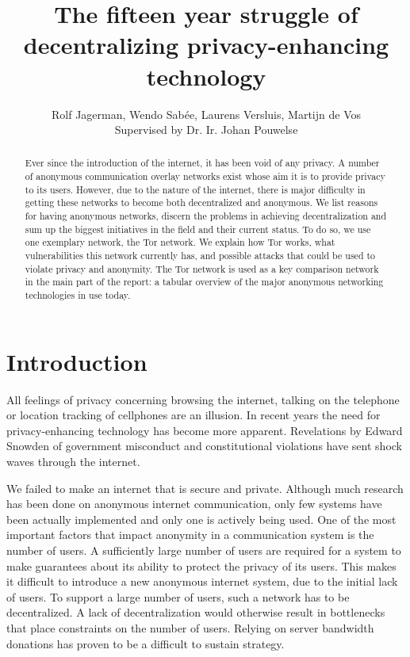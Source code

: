 \documentclass{article}
\begin{document}


\title{The fifteen year struggle of decentralizing privacy-enhancing technology}
\author{Rolf Jagerman, Wendo Sab\'ee, Laurens Versluis, Martijn de Vos\\ Supervised by Dr. Ir. Johan Pouwelse}
\date{}

\pagestyle{empty}


\maketitle
\thispagestyle{empty}

\begin{abstract}
	Ever since the introduction of the internet, it has been void of any privacy. A number of anonymous communication overlay networks exist whose aim it is to provide privacy to its users. However, due to the nature of the internet, there is major difficulty in getting these networks to become both decentralized and anonymous. We list reasons for having anonymous networks, discern the problems in achieving decentralization and sum up the biggest initiatives in the field and their current status. To do so, we use one exemplary network, the Tor network. We explain how Tor works, what vulnerabilities this network currently has, and possible attacks that could be used to violate privacy and anonymity. The Tor network is used as a key comparison network in the main part of the report: a tabular overview of the major anonymous networking technologies in use today.
\end{abstract}


\section{Introduction}
	All feelings of privacy concerning browsing the internet, talking on the telephone or location tracking of cellphones are an illusion. In recent years the need for privacy-enhancing technology has become more apparent. Revelations by Edward Snowden of government misconduct and constitutional violations have sent shock waves through the internet.
	
	We failed to make an internet that is secure and private. Although much research has been done on anonymous internet communication, only few systems have been actually implemented and only one is actively being used. One of the most important factors that impact anonymity in a communication system is the number of users. A sufficiently large number of users are required for a system to make guarantees about its ability to protect the privacy of its users. This makes it difficult to introduce a new anonymous internet system, due to the initial lack of users. To support a large number of users, such a network has to be decentralized. A lack of decentralization would otherwise result in bottlenecks that place constraints on the number of users. Relying on server bandwidth donations has proven to be a difficult to sustain strategy.
	
\end{document}
